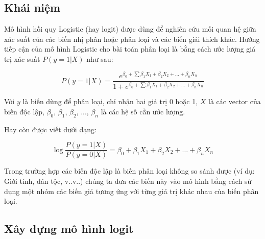 \documentclass[a4paper]{report}\usepackage[]{graphicx}\usepackage[]{color}
\begin{document}
\subsection{Khái niệm}

Mô hình hồi quy Logistic (hay logit) được dùng để nghiên cứu mối quan hệ giữa xác suất của các biến nhị phân hoặc phân loại và các biến giải thích khác. Hướng tiếp cận của mô hình Logistic cho bài toán phân loại là bằng cách ước lượng giá trị xác suất $P(y = 1|X)$ như sau:

{\large
$$
P(y = 1|X) = \frac{e^{\beta_0 + \sum\beta_1X_1 +\beta_2X_2 + \ldots + \beta_nX_n}}{1 + e^{\beta_0 + \sum\beta_1X_1 +\beta_2X_2 + \ldots + \beta_nX_n}}
$$
}

Với $y$ là biến dùng để phân loại, chỉ nhận hai giá trị 0 hoặc 1, $X$ là các vector của biến độc lập, $\beta_0$, $\beta_1$, $\beta_2$, ..., $\beta_n$ là các hệ số cần ước lượng. 

Hay còn được viết dưới dạng:

{\large
$$
\log\frac{P(y = 1|X)}{P(y = 0|X)} = \beta_0 + \beta_1X_1 +\beta_2X_2 + \ldots + \beta_nX_n
$$
}

 
Trong trường hợp các biến độc lập là biến phân loại không so sánh được (ví dụ: Giới tính, dân tộc, v..v..) chúng ta đưa các biến này vào mô hình bằng cách sử dụng một nhóm các biến giả tương ứng với từng giá trị khác nhau của biến phân loại.

\subsection{Xây dựng mô hình logit}
\end{document}
